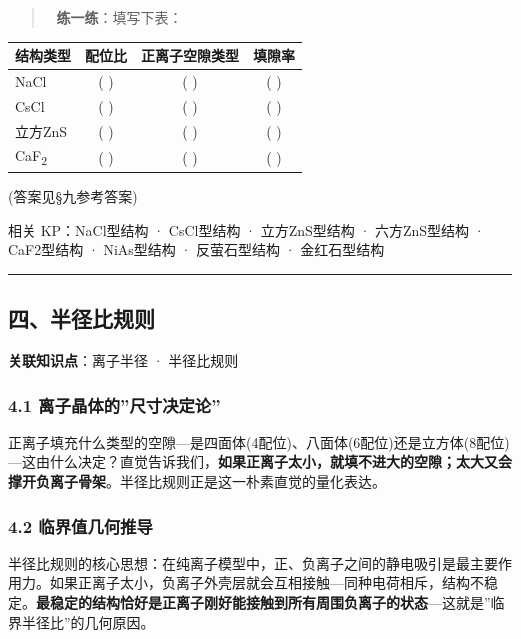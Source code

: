 \begin{quote}
📝 \textbf{练一练}：填写下表：
\end{quote}

{\def\LTcaptype{none} %
\begin{longtable}[]{@{}lccc@{}}
\toprule\noalign{}
结构类型 & 配位比 & 正离子空隙类型 & 填隙率 \\
\midrule\noalign{}
\endhead
\bottomrule\noalign{}
\endlastfoot
NaCl & ( ) & ( ) & ( ) \\
CsCl & ( ) & ( ) & ( ) \\
立方ZnS & ( ) & ( ) & ( ) \\
CaF\textsubscript{2} & ( ) & ( ) & ( ) \\
\end{longtable}
}

(答案见§九参考答案)

相关 KP：NaCl型结构 · CsCl型结构 · 立方ZnS型结构 · 六方ZnS型结构 · CaF2型结构 · NiAs型结构 · 反萤石型结构 · 金红石型结构

\begin{center}\rule{0.5\linewidth}{0.5pt}\end{center}

\subsection{四、半径比规则}\label{ux56dbux534aux5f84ux6bd4ux89c4ux5219}

\textbf{关联知识点}：离子半径 · 半径比规则

\subsubsection{4.1 离子晶体的''尺寸决定论''}\label{ux79bbux5b50ux6676ux4f53ux7684ux5c3aux5bf8ux51b3ux5b9aux8bba}

正离子填充什么类型的空隙---是四面体(4配位)、八面体(6配位)还是立方体(8配位)---这由什么决定？直觉告诉我们，\textbf{如果正离子太小，就填不进大的空隙；太大又会撑开负离子骨架}。半径比规则正是这一朴素直觉的量化表达。

\subsubsection{4.2 临界值几何推导}\label{ux4e34ux754cux503cux51e0ux4f55ux63a8ux5bfc}

半径比规则的核心思想：在纯离子模型中，正、负离子之间的静电吸引是最主要作用力。如果正离子太小，负离子外壳层就会互相接触---同种电荷相斥，结构不稳定。\textbf{最稳定的结构恰好是正离子刚好能接触到所有周围负离子的状态}---这就是''临界半径比''的几何原因。

